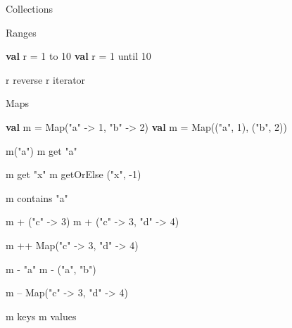 \documentclass[ignorenonframetext,]{beamer}
\newenvironment{Shaded}{\begin{snugshade}}{\end{snugshade}}
\newcommand{\KeywordTok}[1]{\textcolor[rgb]{0.13,0.29,0.53}{\textbf{#1}}}
\newcommand{\DecValTok}[1]{\textcolor[rgb]{0.00,0.00,0.81}{#1}}
\newcommand{\StringTok}[1]{\textcolor[rgb]{0.31,0.60,0.02}{#1}}
\newcommand{\FunctionTok}[1]{\textcolor[rgb]{0.00,0.00,0.00}{#1}}
\newcommand{\NormalTok}[1]{#1}
\begin{document}
\begin{frame}[fragile]{Collections}
\begin{block}{Ranges}
\begin{Shaded}
\begin{Highlighting}[]
\KeywordTok{val}\NormalTok{ r = }\DecValTok{1}\NormalTok{ to }\DecValTok{10}
\KeywordTok{val}\NormalTok{ r = }\DecValTok{1}\NormalTok{ until }\DecValTok{10}

\NormalTok{r reverse}
\NormalTok{r iterator}
\end{Highlighting}
\end{Shaded}

\end{block}

\begin{block}{Maps}

\begin{Shaded}
\begin{Highlighting}[]
\KeywordTok{val}\NormalTok{ m = Map(}\StringTok{"a"}\NormalTok{ -> }\DecValTok{1}\NormalTok{, }\StringTok{"b"}\NormalTok{ -> }\DecValTok{2}\NormalTok{)}
\KeywordTok{val}\NormalTok{ m = Map((}\StringTok{"a"}\NormalTok{, }\DecValTok{1}\NormalTok{), (}\StringTok{"b"}\NormalTok{, }\DecValTok{2}\NormalTok{))}

\FunctionTok{m}\NormalTok{(}\StringTok{"a"}\NormalTok{)}
\NormalTok{m get }\StringTok{"a"}

\NormalTok{m get }\StringTok{"x"}
\NormalTok{m }\FunctionTok{getOrElse}\NormalTok{ (}\StringTok{"x"}\NormalTok{, }\DecValTok{-1}\NormalTok{)}

\NormalTok{m contains }\StringTok{"a"}
\end{Highlighting}
\end{Shaded}

\begin{Shaded}
\begin{Highlighting}[]
\NormalTok{m + (}\StringTok{"c"}\NormalTok{ -> }\DecValTok{3}\NormalTok{)}
\NormalTok{m + (}\StringTok{"c"}\NormalTok{ -> }\DecValTok{3}\NormalTok{, }\StringTok{"d"}\NormalTok{ -> }\DecValTok{4}\NormalTok{)}

\NormalTok{m ++ Map(}\StringTok{"c"}\NormalTok{ -> }\DecValTok{3}\NormalTok{, }\StringTok{"d"}\NormalTok{ -> }\DecValTok{4}\NormalTok{)}

\NormalTok{m - }\StringTok{"a"}
\NormalTok{m - (}\StringTok{"a"}\NormalTok{, }\StringTok{"b"}\NormalTok{)}

\NormalTok{m -- Map(}\StringTok{"c"}\NormalTok{ -> }\DecValTok{3}\NormalTok{, }\StringTok{"d"}\NormalTok{ -> }\DecValTok{4}\NormalTok{)}

\NormalTok{m keys}
\NormalTok{m values}
\end{Highlighting}
\end{Shaded}


\end{block}
\end{frame}
\end{document}
